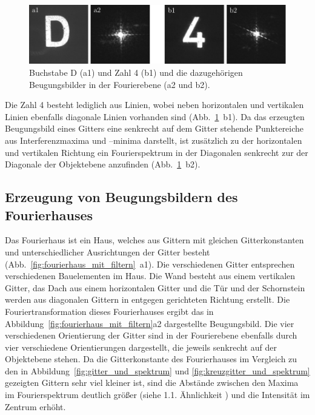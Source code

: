 \begin{figure}[h]
	\centering
	\includegraphics{images/Regina/abb19.pdf}
	\caption[Ziffern mit Fourierspektren]{
		Buchstabe D (a1) und Zahl 4 (b1) und die dazugehörigen Beugungsbilder in der Fourierebene (a2 und b2).
	}
	\label{fig:ziffern_mit_spektren}
\end{figure}

Die Zahl 4 besteht lediglich aus Linien, wobei neben horizontalen und vertikalen Linien ebenfalls diagonale Linien vorhanden sind (Abb.~\ref{fig:ziffern_mit_spektren}~b1). Da das erzeugten Beugungsbild eines Gitters eine senkrecht auf dem Gitter stehende Punktereiche aus Interferenzmaxima und –minima darstellt, ist zusätzlich zu der horizontalen und vertikalen Richtung ein Fourierspektrum in der Diagonalen senkrecht zur der Diagonale der Objektebene anzufinden (Abb.~\ref{fig:ziffern_mit_spektren}~b2).

\subsection{Erzeugung von Beugungsbildern des Fourierhauses}

Das Fourierhaus ist ein Haus, welches aus Gittern mit gleichen Gitterkonstanten und unterschiedlicher Ausrichtungen der Gitter besteht (Abb.~\ref{fig:fourierhaus_mit_filtern}~a1). Die verschiedenen Gitter entsprechen verschiedenen Bauelementen im Haus. Die Wand besteht aus einem vertikalen Gitter, das Dach aus einem horizontalen Gitter und die Tür und der Schornstein werden aus diagonalen Gittern in entgegen gerichteten Richtung erstellt. Die Fouriertransformation dieses Fourierhauses ergibt das in Abbildung~\ref{fig:fourierhaus_mit_filtern}a2 dargestellte Beugungsbild. Die vier verschiedenen Orientierung der Gitter sind in der Fourierebene ebenfalls durch vier verschiedene Orientierungen dargestellt, die jeweils senkrecht auf der Objektebene stehen. Da die Gitterkonstante des Fourierhauses im Vergleich zu den in Abbildung~\ref{fig:gitter_und_spektrum} und \ref{fig:kreuzgitter_und_spektrum} gezeigten Gittern sehr viel kleiner ist, sind die Abstände zwischen den Maxima im Fourierspektrum deutlich größer (siehe 1.1. Ähnlichkeit%
 ) und die Intensität im Zentrum erhöht.


